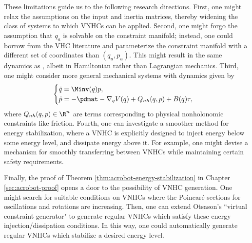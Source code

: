 These limitations guide us to the following research directions. 
First, one might relax the assumptions on the input and inertia
matrices, thereby widening the class of systems to which VNHCs can be applied.
Second, one might forgo the assumption that \(q_a\) is solvable on the
constraint manifold; instead, one could borrow from the VHC literature
and parameterize the constraint manifold with a different set of
coordinates than \((q_u,p_u)\).
This might result in the same dynamics as
\citet{hybrid_zero_dynamics_bipedal_nhvcs}, albeit in Hamiltonian rather than
Lagrangian mechanics.
Third, one might consider more general mechanical systems with dynamics given by
\[
    \begin{cases}
        \dot{q} = \Minv(q) p
        , \\
        \dot{p} = -\pdmat - \nabla_q V(q) + Q_{nh}(q,p) + B(q)\tau
        ,
    \end{cases}
\]
where \(Q_{nh}(q,p) \in \R^n\) are terms corresponding to physical nonholonomic
constraints like friction.
Fourth, one can investigate a smoother method for energy stabilization, where
a VNHC is explicitly designed to inject energy below some energy level, and
dissipate energy above it.
For example, one might devise a mechanism for smoothly transferring
between VNHCs while maintaining certain safety requirements.

Finally, the proof of Theorem \ref{thm:acrobot-energy-stabilization} 
in Chapter \ref{sec:acrobot-proof} opens a door to the possibility of VNHC generation. 
One might search for suitable conditions on VNHCs where the Poincar\'{e}
sections for oscillations and rotations are increasing.
Then, one can extend Otsason's ``virtual constraint
generator" \cite{vcg} to generate regular VNHCs which satisfy
these energy injection/dissipation conditions.
In this way, one could automatically generate regular VNHCs which stabilize a
desired energy level.

